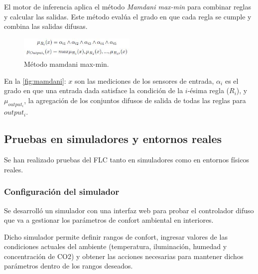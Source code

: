 El motor de inferencia aplica el método \textit{Mamdani max-min} para combinar reglas y calcular las salidas. Este método evalúa el grado en que cada regla se cumple y combina las salidas difusas.

\begin{figure}[H]
	\centering
	\includegraphics[width=0.50\textwidth]{imgs/mamdani.JPG}
	\caption{Método mamdani max-min.}
	\label{fig:mamdani}
\end{figure}

En la \autoref{fig:mamdani}: $x$ son las mediciones de los sensores de entrada, $\alpha_i$ es el grado en que una entrada dada satisface la condición de la $i$-ésima regla ($R_i$), y $\mu_{output_i}$, la agregación de los conjuntos difusos de salida de todas las reglas para $output_i$.

\subsection{Pruebas en simuladores y entornos reales}

Se han realizado pruebas del FLC tanto en simuladores como en entornos físicos reales.

\subsubsection{Configuración del simulador}

Se desarrolló un simulador con una interfaz web para probar el controlador difuso que va a gestionar los parámetros de confort ambiental en interiores.

Dicho simulador permite definir rangos de confort, ingresar valores de las condiciones actuales del ambiente (temperatura, iluminación, humedad y concentración de CO2) y obtener las acciones necesarias para mantener dichos parámetros dentro de los rangos deseados.

